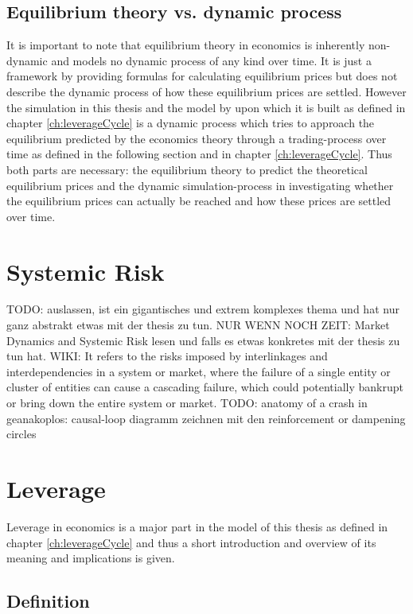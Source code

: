 \documentclass[../Bachelorarbeit.tex]{subfiles}
\begin{document}
\subsection{Equilibrium theory vs. dynamic process}
It is important to note that equilibrium theory in economics is inherently non-dynamic and models no dynamic process of any kind over time. It is just a framework by providing formulas for calculating equilibrium prices but does not describe the dynamic process of how these equilibrium prices are settled. However the simulation in this thesis and the model by \cite{Breuer2015} upon which it is built as defined in chapter \ref{ch:leverageCycle} is a dynamic process which tries to approach the equilibrium predicted by the economics theory through a trading-process over time as defined in the following section and in chapter \ref{ch:leverageCycle}.  Thus both parts are necessary: the equilibrium theory to predict the theoretical equilibrium prices and the dynamic simulation-process in investigating whether the equilibrium prices can actually be reached and how these prices are settled over time.



\section{Systemic Risk}
TODO: auslassen, ist ein gigantisches und extrem komplexes thema und hat nur ganz abstrakt etwas mit der thesis zu tun. NUR WENN NOCH ZEIT: Market Dynamics and Systemic Risk lesen und falls es etwas konkretes mit der thesis zu tun hat.
WIKI: It refers to the risks imposed by interlinkages and interdependencies in a system or market, where the failure of a single entity or cluster of entities can cause a cascading failure, which could potentially bankrupt or bring down the entire system or market.
\cite{Milan2010}
TODO: anatomy of a crash in geanakoplos: causal-loop diagramm zeichnen mit den reinforcement or dampening circles

\section{Leverage}
Leverage in economics is a major part in the model of this thesis as defined in chapter \ref{ch:leverageCycle} and thus a short introduction and overview of its meaning and implications is given.

\subsection{Definition}
\end{document}
